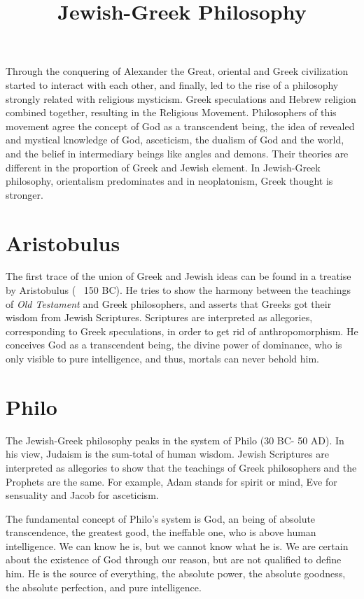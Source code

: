 \documentclass[11pt]{article}
\title{Jewish-Greek Philosophy}
\date{}
\begin{document}
  \maketitle

  \linenumbers

Through the conquering of Alexander the Great, oriental and Greek civilization started to interact with each other, and finally, led to the rise of a philosophy strongly related with religious mysticism. 
Greek speculations and Hebrew religion combined together, resulting in the Religious Movement. 
Philosophers of this movement agree the concept of God as a transcendent being, the idea of revealed and mystical knowledge of God, asceticism, the dualism of God and the world, and the belief in intermediary beings like angles and demons. 
Their theories are different in the proportion of Greek and Jewish element. 
In Jewish-Greek philosophy, orientalism predominates and in neoplatonism, Greek thought is stronger.

\section{Aristobulus}
The first trace of the union of Greek and Jewish ideas can be found in a treatise by Aristobulus (~ 150 BC). 
He tries to show the harmony between the teachings of \textit{Old Testament} and Greek philosophers, and asserts that Greeks got their wisdom from Jewish Scriptures. 
Scriptures are interpreted as allegories, corresponding to Greek speculations, in order to get rid of anthropomorphism. 
He conceives God as a transcendent being, the divine power of dominance, who is only visible to pure intelligence, and thus, mortals can never behold him.

\section{Philo}
The Jewish-Greek philosophy peaks in the system of Philo (30 BC- 50 AD). 
In his view, Judaism is the sum-total of human wisdom. 
Jewish Scriptures are interpreted as allegories to show that the teachings of Greek philosophers and the Prophets are the same. 
For example, Adam stands for spirit or mind, Eve for sensuality and Jacob for asceticism.

\newline

The fundamental concept of Philo’s system is God, an being of absolute transcendence, the greatest good, the ineffable one, who is above human intelligence. 
We can know he is, but we cannot know what he is. 
We are certain about the existence of God through our reason, but are not qualified to define him. 
He is the source of everything, the absolute power, the absolute goodness, the absolute perfection, and pure intelligence.
\end{document}
